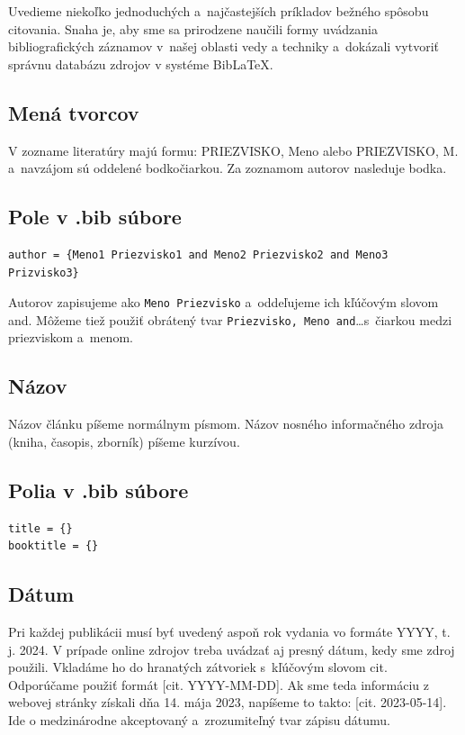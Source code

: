 Uvedieme niekoľko jednoduchých a~najčastejších príkladov bežného
spôsobu citovania.
Snaha je, aby sme sa prirodzene naučili formy uvádzania
bibliografických záznamov v~našej oblasti vedy a techniky
a~dokázali vytvoriť správnu databázu zdrojov v systéme Bib\LaTeX.

\subsection*{Mená tvorcov}
V zozname literatúry majú formu: PRIEZVISKO, Meno alebo PRIEZVISKO, M. a~navzájom sú oddelené bodkočiarkou.
Za zoznamom autorov nasleduje bodka.

\subsection*{\normalsize Pole v .bib súbore}
\begin{verbatim}
author = {Meno1 Priezvisko1 and Meno2 Priezvisko2 and Meno3 Prizvisko3}
\end{verbatim}
Autorov zapisujeme ako \verb|Meno Priezvisko| a~oddeľujeme ich kľúčovým slovom and.
Môžeme tiež použiť obrátený tvar \verb|Priezvisko, Meno and|\dots s~čiarkou medzi priezviskom a~menom.

\subsection*{Názov}
Názov článku píšeme normálnym písmom.
Názov nosného informačného zdroja (kniha, časopis, zborník) píšeme kurzívou.

\subsection*{\normalsize Polia v .bib súbore}
\begin{verbatim}
title = {}
booktitle = {}
\end{verbatim}

\subsection*{Dátum}
Pri každej publikácii musí byť uvedený aspoň rok vydania
vo formáte YYYY, t. j. 2024.
V prípade online zdrojov treba uvádzať aj presný dátum,
kedy sme zdroj použili.
Vkladáme ho do hranatých zátvoriek s~kľúčovým slovom cit.
Odporúčame použiť formát [cit. YYYY-MM-DD].
Ak sme teda informáciu z webovej stránky získali dňa
14. mája 2023,
napíšeme to takto: [cit. 2023-05-14].
Ide o medzinárodne akceptovaný a~zrozumiteľný tvar zápisu dátumu.

